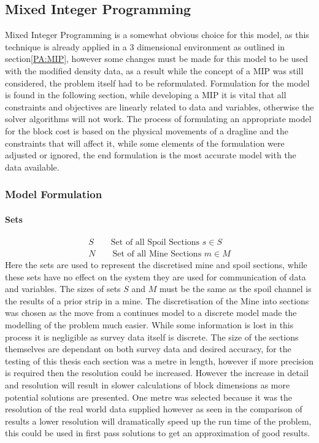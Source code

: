 \subsection{Mixed Integer Programming}
Mixed Integer Programming is a somewhat obvious choice for this model, as this technique is already applied in a 3 dimensional environment as outlined in section\ref{PA:MIP}, however some changes must be made for this model to be used with the modified density data, as a result while the concept of a MIP was still considered, the problem itself had to be reformulated. Formulation for the model is found in the following section, while developing a MIP it is vital that all constraints and objectives are linearly related to data and variables, otherwise the solver algorithms will not work. The process of formulating an appropriate model for the block cost is based on the physical movements of a dragline and the constraints that will affect it, while some elements of the formulation were adjusted or ignored, the end formulation is the most accurate model with the data available. 
\subsubsection{Model Formulation} 
\paragraph*{Sets}
\begin{align}
\label{MIP:Set:S}
S\qquad \text{Set of all Spoil Sections   } s\in S\\
\label{MIP:Set:N}
N\qquad \text{Set  of all Mine Sections } m \in M
\end{align}
Here the sets are used to represent the discretised mine and spoil sections, while these sets have no effect on the system they are used for communication of data and variables. The sizes of sets $S$ and $M$ must be the same as the spoil channel is the results of a prior strip in a mine. The discretisation of the Mine into sections was chosen as the move from a continues model to a discrete model made the modelling of the problem much easier. While some information is lost in this process it is negligible as survey data itself is discrete. The size of the sections themselves are dependant on both survey data and desired accuracy, for the testing of this thesis each section was a metre in length, however if more precision is required then the resolution could be increased. However the increase in detail and resolution will result in slower calculations of block dimensions as more potential solutions are presented. One metre was selected because it was the resolution of the real world data supplied however as seen in the comparison of results a lower resolution will dramatically speed up the run time of the problem, this could be used in first pass solutions to get an approximation of good results. 
